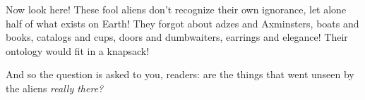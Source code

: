 \documentclass[11pt]{article}
\newcommand{\stage}[3]%
{%
	\begin{spacing}{1}%
	\vspace{0pt}
		\begin{description}[style=nextline, parsep=0pt, leftmargin=15mm, itemindent=-10mm, font=\mdseries]
			\item[\textsc{#1} \emph{#2}] #3
		\end{description}%
	\end{spacing}%
}
\begin{document}
\stage{Metaphysician}{(rising angrily)}{Now look here! These fool aliens don't recognize their own ignorance, let alone half of what exists on Earth! They forgot about adzes and Axminsters, boats and books, catalogs and cups, doors and dumbwaiters, earrings and elegance! Their ontology would fit in a knapsack!}

And so the question is asked to you, readers: are the things that went unseen by the aliens {\em really there?}

%
%
%
\end{document}
